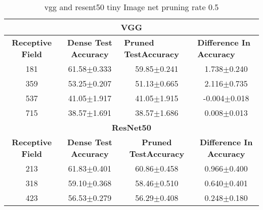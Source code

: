 \begin{table}[]
\begin{tabular}{@{}cccc@{}}
\toprule
\multicolumn{4}{c}{\textbf{VGG}}                                                                                                                                  \\ \midrule
\textbf{Receptive Field} & \textbf{Dense Test Accuracy} & \multicolumn{1}{l}{\textbf{Pruned  TestAccuracy}} & \multicolumn{1}{l}{\textbf{Difference In Accuracy}} \\ \midrule
181                      & 61.58$\pm$0.333              & 59.85$\pm$0.241                                   & 1.738$\pm$0.240                                     \\
359                      & 53.25$\pm$0.207              & 51.13$\pm$0.665                                   & 2.116$\pm$0.735                                     \\
537                      & 41.05$\pm$1.917              & 41.05$\pm$1.915                                   & -0.004$\pm$0.018                                    \\
715                      & 38.57$\pm$1.691              & 38.57$\pm$1.686                                   & 0.008$\pm$0.013                                     \\ \midrule
\multicolumn{4}{c}{\textbf{ResNet50}}                                                                                                                             \\ \midrule
\textbf{Receptive Field} & \textbf{Dense Test Accuracy} & \textbf{Pruned  TestAccuracy}                     & \textbf{Difference In Accuracy}                     \\
213                      & 61.83$\pm$0.401              & 60.86$\pm$0.458                                   & 0.966$\pm$0.400                                     \\
318                      & 59.10$\pm$0.368              & 58.46$\pm$0.510                                   & 0.640$\pm$0.401                                     \\
423                      & 56.53$\pm$0.279              & 56.29$\pm$0.408                                   & 0.248$\pm$0.180                                     \\ \bottomrule
\end{tabular}
\caption{vgg and resent50 tiny Image net pruning rate 0.5}
\label{tab:tiny imagenet pruning rate06}
\end{table}


